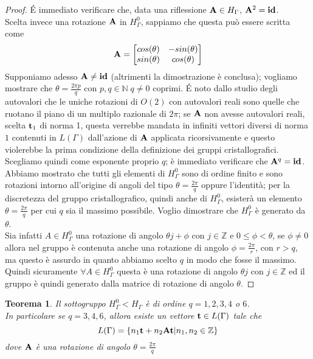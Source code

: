 \documentclass[a4paper,11pt,openright,twoside	]{book}
\newtheorem{theorem}{Teorema}[section]
\begin{document}
\begin{proof}
\'E immediato verificare che, data una riflessione $\vb{A} \in H_{\Gamma}$, $\vb{A}^2 = \vb{id}$. \\
Scelta invece una rotazione $\vb{A}$ in $H_{\Gamma}^{0}$, sappiamo che questa può essere scritta come 
\[ \vb{A} = \begin{bmatrix}{}
cos(\theta) & -sin(\theta) \\ 
sin(\theta) & cos(\theta) \\
\end{bmatrix} \] 
Supponiamo adesso $\vb{A} \neq \vb{id}$ (altrimenti la dimostrazione è conclusa); vogliamo mostrare che $\theta = \frac{2 \pi p}{q}$ con $p, q \in \mathbb{N} \; q \neq 0$ coprimi. \'E noto dallo studio degli autovalori che le uniche rotazioni di $O(2)$ con autovalori reali sono quelle che ruotano il piano di un multiplo razionale di $2 \pi$; se $\vb{A}$ non avesse autovalori reali, scelta $\vb{t}_1$ di norma 1, questa verrebbe mandata in infiniti vettori diversi  di norma $1$ contenuti in $L(\Gamma)$ dall'azione di $\vb{A}$ applicata ricorsivamente e questo violerebbe la prima condizione della definizione dei gruppi cristallografici.
Scegliamo quindi come esponente proprio $q$;  è immediato verificare che $\vb{A}^q = \vb{id}$. \\
Abbiamo mostrato che tutti gli elementi di $H_{\Gamma}^{0}$ sono di ordine finito e sono rotazioni intorno all'origine di angoli del tipo $\theta = \frac{2 \pi}{q}$ oppure l'identità; per la discretezza del gruppo cristallografico, quindi anche di $H_{\Gamma}^{0}$, esisterà un elemento $\theta = \frac{2 \pi}{q}$ per cui $q$ sia il massimo possibile. Voglio dimostrare che $H_{\Gamma}^{0}$ è generato da  $\theta$. \\
Sia infatti $A \in H_{\Gamma}^{0}$ una rotazione di angolo $\theta j + \phi$ con $j \in \mathbb{Z}$ e $0 \leq \phi < \theta$, se $\phi \neq 0$ allora nel gruppo è contenuta anche una rotazione di angolo $\phi = \frac{2 \pi}{r}$, con $r > q$, ma questo è assurdo in quanto abbiamo scelto $q$ in modo che fosse il massimo. Quindi sicuramente $\forall A \in H_{\Gamma}^{0}$ questa è una rotazione di angolo $\theta j$ con $j \in \mathbb{Z}$ ed il gruppo è quindi generato dalla matrice di rotazione di angolo $\theta$. 
\end{proof}
\begin{theorem}
\label{teo:qlg}
Il sottogruppo $H_{\Gamma}^{0} < H_{\Gamma}$ è di ordine $q = 1, 2, 3, 4$ o $6$. \\
In particolare se $q = 3,4,6$, allora esiste un vettore $\vb{t} \in L(\Gamma)$ tale che 
\[ L(\Gamma) = \{ n_1 \vb{t} + n_2 \vb{A} \vb{t} | n_1, n_2 \in \mathbb{Z} \} \]
dove $\vb{A}$ è una rotazione di angolo $\theta = \frac{2 \pi }{q}$ 
\end{theorem}
\end{document}
